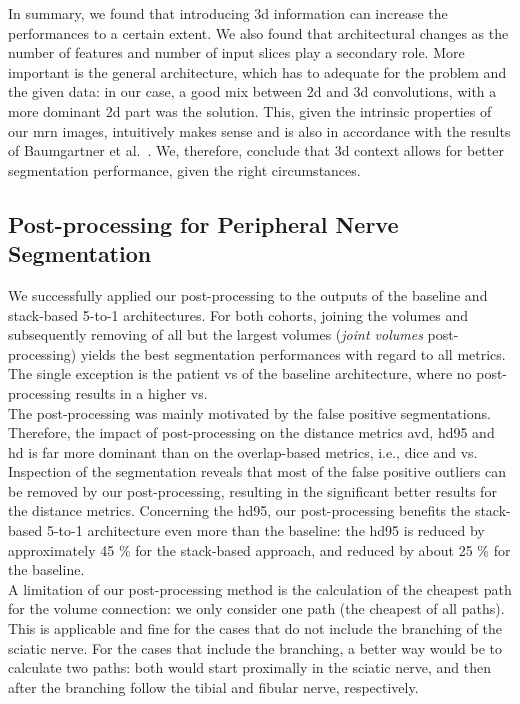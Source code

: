In summary, we found that introducing \gls{3d} information can increase the performances to a certain extent. We also found that architectural changes as the number of features and number of input slices play a secondary role. More important is the general architecture, which has to adequate for the problem and the given data: in our case, a good mix between \gls{2d} and \gls{3d} convolutions, with a more dominant \gls{2d} part was the solution. This, given the intrinsic properties of our \gls{mrn} images, intuitively makes sense and is also in accordance with the results of Baumgartner et al.~\cite{Baumgartner2017AnSegmentation}. We, therefore, conclude that \gls{3d} context allows for better segmentation performance, given the right circumstances.

\subsection{Post-processing for Peripheral Nerve Segmentation}
We successfully applied our post-processing to the outputs of the baseline and stack-based 5-to-1 architectures. For both cohorts, joining the volumes and subsequently removing of all but the largest volumes (\textit{joint volumes} post-processing) yields the best segmentation performances with regard to all metrics. The single exception is the patient \acrlong{vs} of the baseline architecture, where no post-processing results in a higher \gls{vs}.\\
The post-processing was mainly motivated by the false positive segmentations. Therefore, the impact of post-processing on the distance metrics \gls{avd}, \gls{hd95} and \gls{hd} is far more dominant than on the overlap-based metrics, i.e., \gls{dice} and \gls{vs}. Inspection of the segmentation reveals that most of the false positive outliers can be removed by our post-processing, resulting in the significant better results for the distance metrics.
Concerning the \acrlong{hd95}, our post-processing benefits the stack-based 5-to-1 architecture even more than the baseline: the \gls{hd95} is reduced by approximately 45 \% for the stack-based approach, and reduced by about 25 \% for the baseline.\\
A limitation of our post-processing method is the calculation of the cheapest path for the volume connection: we only consider one path (the cheapest of all paths). This is applicable and fine for the cases that do not include the branching of the sciatic nerve. For the cases that include the branching, a better way would be to calculate two paths: both would start proximally in the sciatic nerve, and then after the branching follow the tibial and fibular nerve, respectively.

